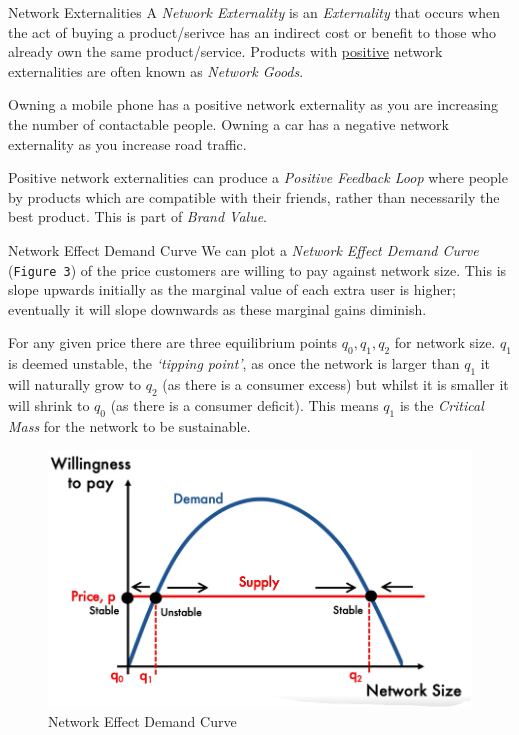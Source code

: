 \documentclass[11pt,a4paper]{article}
\begin{document}
  \begin{definition}{Network Externalities}
    A \textit{Network Externality} is an \textit{Externality} that occurs when the act of buying a product/serivce has an indirect cost or benefit to those who already own the same product/service. Products with \underline{positive} network externalities are often known as \textit{Network Goods}.

    \par Owning a mobile phone has a positive network externality as you are increasing the number of contactable people. Owning a car has a negative network externality as you increase road traffic.

    \par Positive network externalities can produce a \textit{Positive Feedback Loop} where people by products which are compatible with their friends, rather than necessarily the best product. This is part of \textit{Brand Value}.
  \end{definition}

  \begin{definition}{Network Effect Demand Curve}
    We can plot a \textit{Network Effect Demand Curve} (\texttt{Figure 3}) of the price customers are willing to pay against network size. This is slope upwards initially as the marginal value of each extra user is higher; eventually it will slope downwards as these marginal gains diminish.

    \par For any given price there are three equilibrium points $q_0,q_1,q_2$ for network size. $q_1$ is deemed unstable, the \textit{`tipping point'}, as once the network is larger than $q_1$ it will naturally grow to $q_2$ (as there is a consumer excess) but whilst it is smaller it will shrink to $q_0$ (as there is a consumer deficit). This means $q_1$ is the \textit{Critical Mass} for the network to be sustainable.
  \end{definition}

  \begin{figure}[ht!]
    \centering
    \includegraphics[width=.5\textwidth]{networkDemandCurve.PNG}
    \caption{Network Effect Demand Curve}
  \end{figure}
\end{document}
